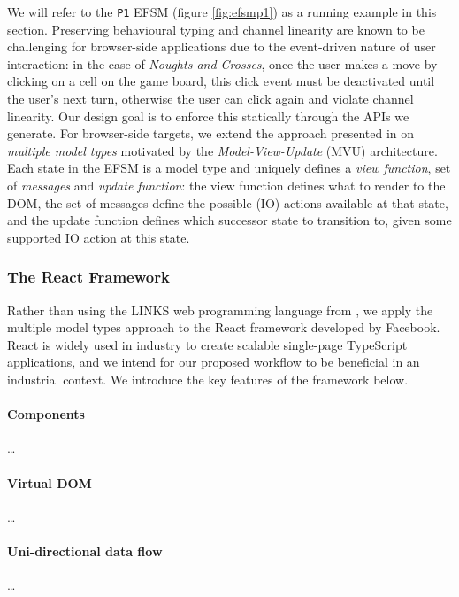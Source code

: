 \documentclass[submission,copyright,creativecommons]{eptcs}
\begin{document}
We will refer to the \texttt{P1} EFSM (figure \ref{fig:efsmp1}) as a running example in this section. Preserving behavioural typing and channel linearity are known to be challenging for browser-side applications due to the event-driven nature of user interaction: in the case of \textit{Noughts and Crosses}, once the user makes a move by clicking on a cell on the game board, this click event must be deactivated until the user's next turn, otherwise the user can click again and violate channel linearity. Our design goal is to enforce this statically through the APIs we generate. For browser-side targets, we extend the approach presented in \cite{MVU2019} on \textit{multiple model types} motivated by the \textit{Model-View-Update} (MVU) architecture. Each state in the EFSM is a model type and uniquely defines a \textit{view function}, set of \textit{messages} and \textit{update function}: the view function defines what to render to the DOM, the set of messages define the possible (IO) actions available at that state, and the update function defines which successor state to transition to, given some supported IO action at this state.

\subsubsection{The React Framework}
Rather than using the LINKS web programming language from \cite{MVU2019}, we apply the multiple model types approach to the React framework \cite{React} developed by Facebook. React is widely used in industry to create scalable single-page TypeScript applications, and we intend for our proposed workflow to be beneficial in an industrial context. We introduce the key features of the framework below.

\paragraph{Components} \dots

\paragraph{Virtual DOM} \dots

\paragraph{Uni-directional data flow} \dots
\end{document}
